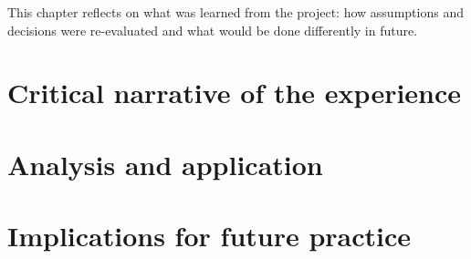 %

This chapter reflects on what was learned from the project: how assumptions and decisions were re-evaluated and what would be done differently in future.

\section{Critical narrative of the experience}\label{sec:challenges}

\lipsum[41-42]

\section{Analysis and application}\label{sec:reflection}

\lipsum[43-44]

\section{Implications for future practice}\label{sec:implications}

\lipsum[45-46]
